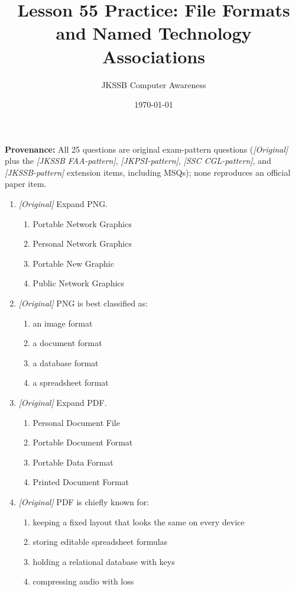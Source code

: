 \documentclass[11pt]{article}
\title{Lesson 55 Practice: File Formats and Named Technology Associations}
\author{JKSSB Computer Awareness}
\date{\today}
\begin{document}
\maketitle
\noindent\textbf{Provenance:} All 25 questions are original exam-pattern questions (\textit{[Original]} plus the \textit{[JKSSB FAA-pattern]}, \textit{[JKPSI-pattern]}, \textit{[SSC CGL-pattern]}, and \textit{[JKSSB-pattern]} extension items, including MSQs); none reproduces an official paper item.

\begin{enumerate}[label=\textbf{Q\arabic*.}, leftmargin=*]
\item \textit{[Original]} Expand PNG.
  \begin{enumerate}[label=\Alph*.]
    \item Portable Network Graphics
    \item Personal Network Graphics
    \item Portable New Graphic
    \item Public Network Graphics
  \end{enumerate}
\item \textit{[Original]} PNG is best classified as:
  \begin{enumerate}[label=\Alph*.]
    \item an image format
    \item a document format
    \item a database format
    \item a spreadsheet format
  \end{enumerate}
\item \textit{[Original]} Expand PDF.
  \begin{enumerate}[label=\Alph*.]
    \item Personal Document File
    \item Portable Document Format
    \item Portable Data Format
    \item Printed Document Format
  \end{enumerate}
\item \textit{[Original]} PDF is chiefly known for:
  \begin{enumerate}[label=\Alph*.]
    \item keeping a fixed layout that looks the same on every device
    \item storing editable spreadsheet formulas
    \item holding a relational database with keys
    \item compressing audio with loss

\end{enumerate}
\end{enumerate}
\end{document}
